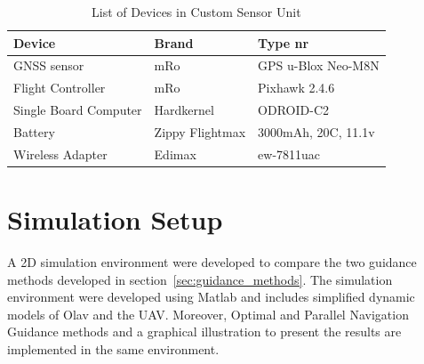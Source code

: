 \begin{table}[!htb]
  \centering
  \begin{tabular}{l l l}
    \toprule
    \textbf{Device}&\textbf{Brand}&\textbf{Type nr}\\ \hline
    GNSS sensor&mRo&GPS u-Blox Neo-M8N\\
    Flight Controller&mRo&Pixhawk 2.4.6\\
    Single Board Computer&Hardkernel&ODROID-C2\\
    Battery&Zippy Flightmax&3000mAh, 20C, 11.1v\\
    Wireless Adapter&Edimax&ew-7811uac\\
    \bottomrule
  \end{tabular}
  \caption{List of Devices in Custom Sensor Unit}
  \label{tab:partListLandingPad}
\end{table}




\section{Simulation Setup} %
\label{sec:simulation_setup}
A 2D simulation environment were developed to compare the two guidance methods developed in section~\ref{sec:guidance_methods}. The simulation environment were developed using Matlab and includes simplified dynamic models of Olav and the UAV. Moreover, Optimal and Parallel Navigation Guidance methods and a graphical illustration to present the results are implemented in the same environment.

